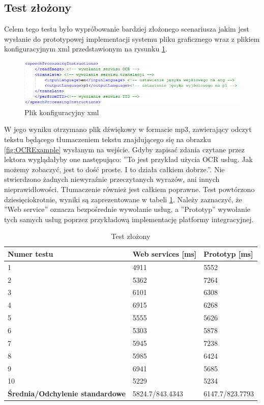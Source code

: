 \subsection{Test złożony}
Celem tego testu było wypróbowanie bardziej złożonego scenariusza jakim jest wysłanie do prototypowej implementacji systemu pliku graficznego wraz z plikiem konfiguracyjnym xml przedstawionym na rysunku \ref{fig:xmlConf}.

\begin{figure}[!h]
\centering
\includegraphics[scale=0.9]{xmlConf.png}
\caption{Plik konfiguracyjny xml}\label{fig:xmlConf}
\end{figure}
W jego wyniku otrzymano plik dźwiękowy w formacie mp3, zawierający odczyt tekstu będącego tłumaczeniem tekstu znajdującego się na obrazku \ref{fig:OCRExample} wysłanym na wejście. Gdyby zapisać zdania czytane przez lektora wyglądałyby one następująco: ''To jest przykład użycia OCR usług. Jak możemy zobaczyć, jest to dość proste. I to działa całkiem dobrze.''. Nie stwierdzono żadnych niewyraźnie przeczytanych wyrazów, ani innych nieprawidłowości. Tłumaczenie również jest całkiem poprawne. Test powtórzono dziesięciokrotnie, wyniki są zaprezentowane w tabeli \ref{tab:bigTest}. Należy zaznaczyć, że ''Web service'' oznacza bezpośrednie wywołanie usług, a ''Prototyp'' wywołanie tych samych usług poprzez przykładową implementację platformy integracyjnej.
\begin{center}
	\begin{table}[h]
	\caption{Test złożony}
	\label{tab:bigTest}
	\centering
	\begin{tabular}{| l | l | l |}	
		\hline
		\textbf{Numer testu} & \textbf{Web services [ms]} & \textbf{Prototyp [ms]} \\ \hline
		1 & 4911 & 5552\\ \hline
		2 & 5362 & 7264\\ \hline
		3 & 6101 & 6308\\ \hline
		4 & 6915 & 6268\\ \hline
		5 & 5555 & 5626\\ \hline
		6 & 5303 & 5878\\ \hline
		7 & 5945 & 7238\\ \hline
		8 & 5985 & 6424\\ \hline
		9 & 6941 & 5685\\ \hline
		10 & 5229 & 5234\\ \hline
		\textbf{Średnia/Odchylenie standardowe} & 5824.7/843.4343 & 6147.7/823.7793\\ 
		\hline
	\end{tabular}
	\end{table}
\end{center}
